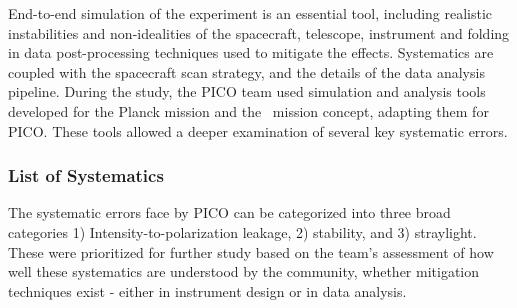 \documentclass[PICOReport.tex]{subfiles}
\begin{document}
End-to-end simulation of the experiment is an essential tool,
including realistic instabilities and non-idealities of the spacecraft,
telescope, instrument and folding in data post-processing techniques
used to mitigate the effects.  Systematics are coupled with the
spacecraft scan strategy, and the details of the 
data analysis pipeline.  During the study, the PICO team used 
 simulation and analysis tools developed for the Planck mission\cite{plank2015_xii_focalplane} and 
the \core\ mission concept, adapting them for PICO.  These tools allowed
a deeper examination of several key systematic errors. 

\subsubsection{List of Systematics}
The systematic errors face by PICO can be categorized into three broad categories 
1) Intensity-to-polarization leakage, 2) stability, and 3)
straylight.    These were prioritized for further study based on the
team's assessment of how well these systematics are understood by the
community, whether mitigation techniques exist - either in instrument
design or in data analysis.
\end{document}
